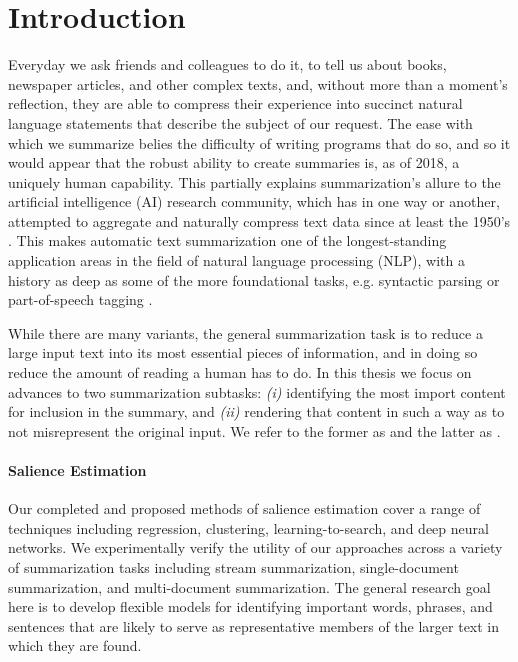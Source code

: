 \section{Introduction}

Everyday we ask friends and colleagues to do it, to tell us about books, 
newspaper articles, and other complex texts, and, without more than a 
moment's reflection, they are able to compress their experience
into succinct natural language statements that describe the
subject of our request.
The ease with which we summarize belies the difficulty of
writing programs that do so, and so it would appear that 
the robust
ability to create summaries is, as of 2018, a uniquely human capability.
This partially explains summarization's allure to the artificial intelligence (AI)
research community, which has in one way or another, attempted to aggregate
and naturally compress text data since at least the 1950's 
\citep{luhn1958automatic}.
This makes automatic text summarization one of the longest-standing 
application areas in the 
field of natural language processing (NLP), with a history as deep 
as some of the more foundational tasks, e.g. syntactic parsing 
\citep{yngve1955syntax} or 
part-of-speech tagging \citep{harris1962string}. 

While there are many variants, 
the general summarization task is 
to reduce a large input text into its most essential pieces of information,
and in doing so reduce the amount of reading a human has to do. 
In this thesis we focus on advances to two summarization subtasks:
\textit{(i)} identifying the most import content for inclusion in the summary, 
and \textit{(ii)}
rendering that content in such a way as to not misrepresent the original 
input. We refer to the former as  and the latter
as . 

\paragraph{Salience Estimation} Our completed and proposed methods of salience estimation cover a range of
techniques including regression, clustering, learning-to-search,
and deep neural networks. 
We experimentally verify the utility of our approaches
across a variety of summarization tasks including stream summarization,
single-document summarization, and multi-document summarization.
The general research goal here is to develop flexible models for 
identifying
important words, phrases, and sentences that are likely to serve as 
representative members of the larger text in which they are found.


